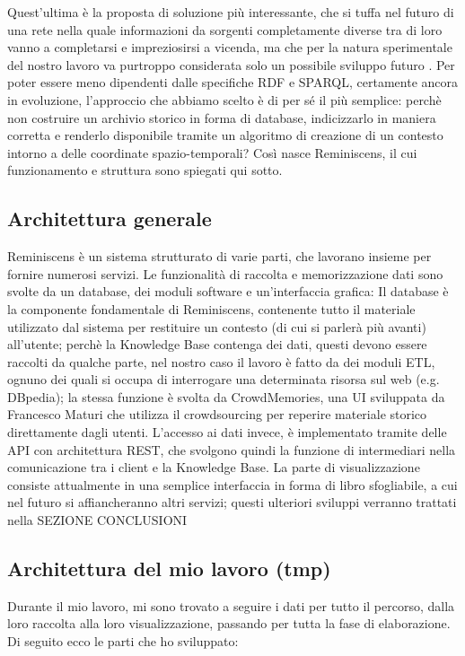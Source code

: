 \documentclass[sigproc-sp.tex]{subfiles}
\begin{document}
Quest’ultima è la proposta di soluzione più interessante, che si tuffa nel futuro di una rete nella quale informazioni da sorgenti completamente diverse tra di loro vanno a completarsi e impreziosirsi a vicenda, ma che per la natura sperimentale del nostro lavoro va purtroppo considerata solo un possibile sviluppo futuro .
Per poter essere meno dipendenti dalle specifiche RDF e SPARQL, certamente ancora in evoluzione, l’approccio che abbiamo scelto è di per sé il più semplice: perchè non costruire un archivio storico in forma di database, indicizzarlo in maniera corretta e renderlo disponibile tramite un algoritmo di creazione di un contesto intorno a delle coordinate spazio-temporali? Così nasce Reminiscens, il cui funzionamento e struttura sono spiegati qui sotto.

\subsection{Architettura generale}
Reminiscens è un sistema strutturato di varie parti, che lavorano insieme per fornire numerosi servizi. Le funzionalità di raccolta e memorizzazione dati sono svolte da un database, dei moduli software e un’interfaccia grafica: Il database è la componente fondamentale di Reminiscens, contenente tutto il materiale utilizzato dal sistema per restituire un contesto (di cui si parlerà più avanti) all’utente; perchè la Knowledge Base contenga dei dati, questi devono essere raccolti da qualche parte, nel nostro caso il lavoro è fatto da dei moduli ETL, ognuno dei quali si occupa di interrogare una determinata risorsa sul web (e.g. DBpedia); la stessa funzione è svolta da CrowdMemories, una UI sviluppata da Francesco Maturi che utilizza il crowdsourcing per reperire materiale storico direttamente dagli utenti. L’accesso ai dati invece, è implementato tramite delle API con architettura REST, che svolgono quindi la funzione di intermediari nella comunicazione tra i client e la Knowledge Base. La parte di visualizzazione consiste attualmente in una semplice interfaccia in forma di libro sfogliabile, a cui nel futuro si affiancheranno altri servizi; questi ulteriori sviluppi verranno trattati nella SEZIONE CONCLUSIONI

\subsection{Architettura del mio lavoro (tmp)}
Durante il mio lavoro, mi sono trovato a seguire i dati per tutto il percorso, dalla loro raccolta alla loro visualizzazione, passando per tutta la fase di elaborazione. Di seguito ecco le parti che ho sviluppato:
\end{document}
